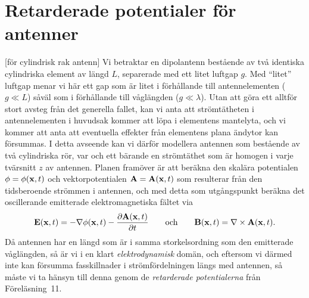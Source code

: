 \section{Retarderade potentialer f{\"o}r antenner}
[f{\"o}r cylindrisk rak antenn]
Vi betraktar en dipolantenn best{\aa}ende av tv{\aa} identiska cylindriska
element av l{\"a}ngd $L$, separerade med ett litet luftgap $g$. Med ``litet''
luftgap menar vi h{\"a}r ett gap som {\"a}r litet i f{\"o}rh{\aa}llande till
antennelementen ($g\ll L$) s{\aa}v{\"a}l som i f{\"o}rh{\aa}llande till
v{\aa}gl{\"a}ngden ($g\ll\lambda$).
Utan att g{\"o}ra ett alltf{\"o}r stort avsteg fr{\aa}n det generella fallet,
kan vi anta att str{\"o}mt{\"a}theten i antennelementen i huvudsak kommer att
l{\"o}pa i elementens mantelyta, och vi kommer att anta att eventuella effekter
fr{\aa}n elementens plana {\"a}ndytor kan f{\"o}rsummas.
I detta avseende kan vi d{\"a}rf{\"o}r modellera antennen som best{\aa}ende av
tv{\aa} cylindriska r{\"o}r, var och ett b{\"a}rande en str{\"o}mt{\"a}thet som
{\"a}r homogen i varje tv{\"a}rsnitt $z$ av antennen.
\noindent{}
Planen fram{\"o}ver {\"a}r att ber{\"a}kna den skal{\"a}ra potentialen
$\phi=\phi({\bf x},t)$ och vektorpotentialen ${\bf A}={\bf A}({\bf x},t)$ som
resulterar fr{\aa}n den tidsberoende str{\"o}mmen i antennen, och med detta
som utg{\aa}ngs\-punkt ber{\"a}kna det oscillerande emitterade elektromagnetiska
f{\"a}ltet via
$$
  {\bf E}({\bf x},t)
    =-\nabla\phi({\bf x},t)
        -{{\partial{\bf A}({\bf x},t)}\over{\partial t}}
  \qquad\hbox{och}\qquad
  {\bf B}({\bf x},t)
    =\nabla\times{\bf A}({\bf x},t).
$$
D{\aa} antennen har en l{\"a}ngd som {\"a}r i samma storkelsordning som den
emitterade v{\aa}gl{\"a}ngden, s{\aa} {\"a}r vi i en klart {\it elektrodynamisk}
dom{\"a}n, och eftersom vi d{\"a}rmed inte kan f{\"o}rsumma fasskillnader i
str{\"o}mf{\"o}rdelningen l{\"a}ngs med antennen, s{\aa} m{\aa}ste vi ta
h{\"a}nsyn till denna genom de {\it retarderade potentialerna} fr{\aa}n
F{\"o}rel{\"a}sning~11.

